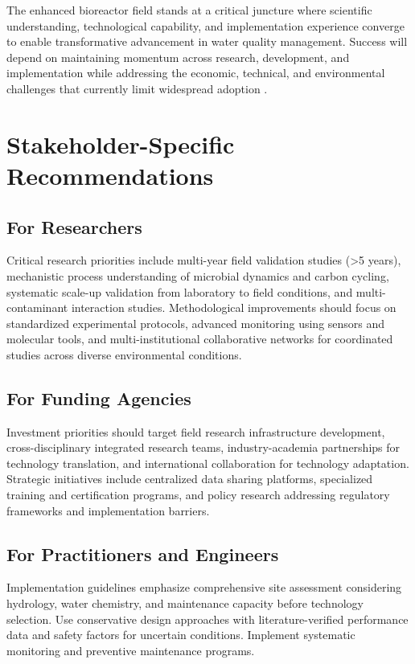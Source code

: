 \documentclass[12pt,a4paper]{article}
\begin{document}
The enhanced bioreactor field stands at a critical juncture where scientific understanding, technological capability, and implementation experience converge to enable transformative advancement in water quality management. Success will depend on maintaining momentum across research, development, and implementation while addressing the economic, technical, and environmental challenges that currently limit widespread adoption \citep{RN625, RN310}.

\section{Stakeholder-Specific Recommendations}

\subsection{For Researchers}

Critical research priorities include multi-year field validation studies (>5 years), mechanistic process understanding of microbial dynamics and carbon cycling, systematic scale-up validation from laboratory to field conditions, and multi-contaminant interaction studies. Methodological improvements should focus on standardized experimental protocols, advanced monitoring using sensors and molecular tools, and multi-institutional collaborative networks for coordinated studies across diverse environmental conditions.

\subsection{For Funding Agencies}

Investment priorities should target field research infrastructure development, cross-disciplinary integrated research teams, industry-academia partnerships for technology translation, and international collaboration for technology adaptation. Strategic initiatives include centralized data sharing platforms, specialized training and certification programs, and policy research addressing regulatory frameworks and implementation barriers. 

\subsection{For Practitioners and Engineers}

Implementation guidelines emphasize comprehensive site assessment considering hydrology, water chemistry, and maintenance capacity before technology selection. Use conservative design approaches with literature-verified performance data and safety factors for uncertain conditions. Implement systematic monitoring and preventive maintenance programs. 
\end{document}
